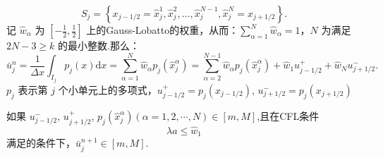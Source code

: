\documentclass{book}
\begin{document}
\begin{equation}
    S_{j}=\left\{x_{j-1 / 2}=\hat{x}_{j}^{1}, \hat{x}_{j}^{2}, \ldots, \hat{x}_{j}^{N-1}, \hat{x}_{j}^{N}=x_{j+1 / 2}\right\} .
\end{equation}
记 $\hat{w}_{\alpha}$ 为 $\left[-\frac{1}{2}, \frac{1}{2}\right]$ 上的Gauss-Lobatto的权重，从而：$\sum_{\alpha=1}^{N} \hat{w}_{\alpha}=1$，$N$ 为满足 $2 N-3 \geqslant k$ 的最小整数.那么：
\begin{equation}
    \label{eqa:pp_ave_u}
    \bar{u}_{j}^{n}=\frac{1}{\Delta x} \int_{I_{j}} p_{j}(x) \mathrm{d} x=\sum_{\alpha=1}^{N} \hat{w}_{\alpha} p_{j}\left(\hat{x}_{j}^{\alpha}\right)=\sum_{\alpha=2}^{N-1} \hat{w}_{\alpha} p_{j}\left(\hat{x}_{j}^{\alpha}\right)+\hat{w}_{1} u_{j-1 / 2}^{+}+\hat{w}_{N} u_{j+1 / 2}^{-} .
\end{equation}
$p_j$ 表示第 $j$ 个小单元上的多项式，$u_{j-1/2}^+=p_j(x_{j-1/2})$, $u_{j+1/2}^-=p_j(x_{j+1/2})$
\begin{theorem}{}{}
    如果 $u_{j-1/2}^-$, $u_{j+1/2}^+$, $p_j(\hat{x}_j^\alpha)(\alpha=1,2,\cdots,N)\in[m,M]$,且在CFL条件
    \begin{equation}
        \lambda a \leq \hat{w}_{1}
    \end{equation}
    满足的条件下，$\bar{u}_j^{n+1}\in[m,M]$.
\end{theorem}
\end{document}
